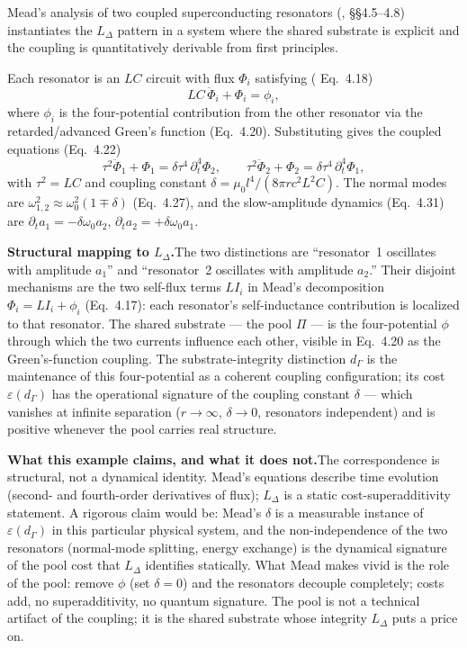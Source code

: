 \documentclass[11pt]{article}
\theoremstyle{remark}
\begin{document}
\begin{tcolorbox}[apfbox, title={Physical anchor: coupled superconducting resonators as an $L_\Delta$ instance}]
Mead's analysis of two coupled superconducting resonators (\cite{Mead2000}, \S\S 4.5--4.8) instantiates the $L_\Delta$ pattern in a system where the shared substrate is explicit and the coupling is quantitatively derivable from first principles.

\smallskip\noindent Each resonator is an $LC$ circuit with flux $\Phi_i$ satisfying (\cite{Mead2000} Eq.~4.18)
\[
LC\,\ddot{\Phi}_i + \Phi_i = \phi_i,
\]
where $\phi_i$ is the four-potential contribution from the other resonator via the retarded/advanced Green's function (Eq.~4.20).  Substituting gives the coupled equations (Eq.~4.22)
\[
\tau^2 \ddot{\Phi}_1 + \Phi_1 = \delta\tau^4\,\partial_t^4 \Phi_2, \qquad \tau^2 \ddot{\Phi}_2 + \Phi_2 = \delta\tau^4\,\partial_t^4 \Phi_1,
\]
with $\tau^2 = LC$ and coupling constant $\delta = \mu_0 l^4/(8\pi r c^2 L^2 C)$.  The normal modes are $\omega_{1,2}^2 \approx \omega_0^2(1 \mp \delta)$ (Eq.~4.27), and the slow-amplitude dynamics (Eq.~4.31) are $\partial_t a_1 = -\delta\omega_0 a_2$, $\partial_t a_2 = +\delta\omega_0 a_1$.

\smallskip\noindent\textbf{Structural mapping to $L_\Delta$.}\quad The two distinctions are ``resonator~1 oscillates with amplitude $a_1$'' and ``resonator~2 oscillates with amplitude $a_2$.''  Their disjoint mechanisms are the two self-flux terms $LI_i$ in Mead's decomposition $\Phi_i = LI_i + \phi_i$ (Eq.~4.17): each resonator's self-inductance contribution is localized to that resonator.  The shared substrate --- the pool $\Pi$ --- is the four-potential $\phi$ through which the two currents influence each other, visible in Eq.~4.20 as the Green's-function coupling.  The substrate-integrity distinction $d_\Gamma$ is the maintenance of this four-potential as a coherent coupling configuration; its cost $\varepsilon(d_\Gamma)$ has the operational signature of the coupling constant $\delta$ --- which vanishes at infinite separation ($r \to \infty$, $\delta \to 0$, resonators independent) and is positive whenever the pool carries real structure.

\smallskip\noindent\textbf{What this example claims, and what it does not.}\quad The correspondence is structural, not a dynamical identity.  Mead's equations describe time evolution (second- and fourth-order derivatives of flux); $L_\Delta$ is a static cost-superadditivity statement.  A rigorous claim would be: Mead's $\delta$ is a measurable instance of $\varepsilon(d_\Gamma)$ in this particular physical system, and the non-independence of the two resonators (normal-mode splitting, energy exchange) is the dynamical signature of the pool cost that $L_\Delta$ identifies statically.  What Mead makes vivid is the role of the pool: remove $\phi$ (set $\delta = 0$) and the resonators decouple completely; costs add, no superadditivity, no quantum signature.  The pool is not a technical artifact of the coupling; it is the shared substrate whose integrity $L_\Delta$ puts a price on.
\end{tcolorbox}
\end{document}
